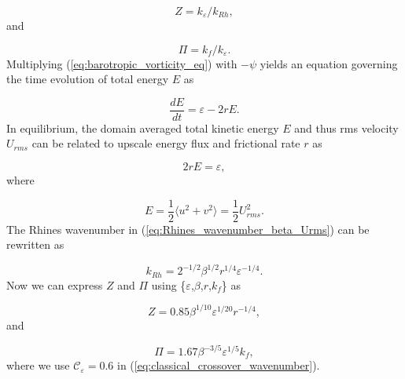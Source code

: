 \documentclass{ametsoc}
\begin{document}
\begin{equation}
Z=k_{\varepsilon}/k_{Rh},\label{eq:zono_idx_estimate}
\end{equation}
and

\[
\Pi=k_{f}/k_{\varepsilon}.
\]
Multiplying (\ref{eq:barotropic_vorticity_eq}) with $-\psi$ yields
an equation governing the time evolution of total energy $E$ as

\begin{equation}
\frac{dE}{dt}=\varepsilon-2rE.\label{eq:energy_evolution_equation}
\end{equation}
In equilibrium, the domain averaged total kinetic energy $E$ and
thus rms velocity $U_{rms}$ can be related to upscale energy flux
and frictional rate $r$ as

\[
2rE=\varepsilon,
\]
where 

\[
E=\frac{1}{2}\langle u^{2}+v^{2}\rangle=\frac{1}{2}U_{rms}^{2}.
\]
The Rhines wavenumber in (\ref{eq:Rhines_wavenumber_beta_Urms}) can
be rewritten as

\begin{equation}
k_{Rh}=2^{-1/2}\beta^{1/2}r^{1/4}\varepsilon^{-1/4}.\label{eq:Rhines_wavenumber_beta_r_epsilon}
\end{equation}
Now we can express $Z$ and $\Pi$ using \{$\varepsilon$,$\beta$,$r$,$k_{f}$\}
as

\begin{equation}
Z=0.85\beta^{1/10}\varepsilon^{1/20}r^{-1/4},\label{eq:Z_estimate_in_work}
\end{equation}
and

\begin{equation}
\Pi=1.67\beta^{-3/5}\varepsilon^{1/5}k_{f},\label{eq:PI_estimate_in_work}
\end{equation}
where we use $\mathcal{\mathcal{C}_{\varepsilon}}=0.6$ in (\ref{eq:classical_crossover_wavenumber}).
\end{document}
